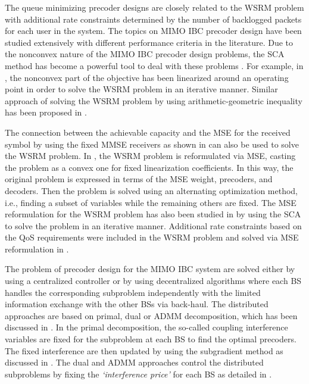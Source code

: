 The queue minimizing precoder designs are closely related to the \ac{WSRM} problem with additional rate constraints determined by the number of backlogged packets for each user in the system. The topics on \ac{MIMO} \ac{IBC} precoder design have been studied extensively with different performance criteria in the literature. Due to the nonconvex nature of the \ac{MIMO} \ac{IBC} precoder design problems, the \ac{SCA} method has become a powerful tool to deal with these problems \cite{bertsekas1999nonlinear}. For example, in \cite{sin_algorithm}, the nonconvex part of the objective has been linearized around an operating point in order to solve the \ac{WSRM} problem in an iterative manner. Similar approach of solving the \ac{WSRM} problem by using arithmetic-geometric inequality has been proposed in \cite{tran2012fast}.

The connection between the achievable capacity and the \ac{MSE} for the received symbol by using the fixed \ac{MMSE} receivers as shown in \cite{mse_duality,christensen2008weighted} can also be used to solve the \ac{WSRM} problem. In \cite{christensen2008weighted,wmmse_shi}, the \ac{WSRM} problem is reformulated via \ac{MSE}, casting the problem as a convex one for fixed linearization coefficients. In this way, the original problem is expressed in terms of the \ac{MSE} weight, precoders, and decoders. Then the problem is solved using an alternating optimization method, i.e., finding a subset of variables while the remaining others are fixed. The \ac{MSE} reformulation for the \ac{WSRM} problem has also been studied in \cite{hong2012decomposition} by using the \ac{SCA} to solve the problem in an iterative manner. Additional rate constraints based on the \ac{QoS} requirements were included in the \ac{WSRM} problem and solved via \ac{MSE} reformulation in \cite{kaleva2013primal,kaleva2013decentralized}.

The problem of precoder design for the \ac{MIMO} \ac{IBC} system are solved either by using a centralized controller or by using decentralized algorithms where each \ac{BS} handles the corresponding subproblem independently with the limited information exchange with the other \acp{BS} via back-haul. The distributed approaches are based on primal, dual or \ac{ADMM} decomposition, which has been discussed in \cite{palomar2006tutorial,boyd2011distributed}. In the  primal decomposition, the so-called coupling interference variables are fixed for the subproblem at each \ac{BS} to find the optimal precoders. The fixed interference are then updated by using the subgradient method as discussed in \cite{pennanen2011decentralized}. The dual and \ac{ADMM} approaches control the distributed subproblems by fixing the \emph{`interference price'} for each \ac{BS} as detailed in \cite{tolli2011decentralized}.

